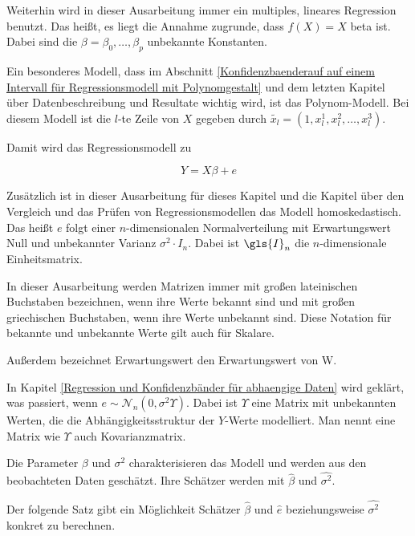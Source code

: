 \documentclass[12pt,a4paper]{article}
\theoremstyle{definition}
\theoremstyle{definition}
\theoremstyle{definition}
\theoremstyle{definition}
\begin{document}
Weiterhin wird in dieser Ausarbeitung immer ein multiples, lineares Regression benutzt. Das heißt, es liegt die Annahme zugrunde, dass $f(X) = X$ \gls{beta} ist. Dabei sind die $\beta = \beta_{0}, \ldots, \beta_{p}$ unbekannte Konstanten. 

Ein besonderes Modell, dass im Abschnitt \ref{Konfidenzbaenderauf auf einem Intervall für Regressionsmodell mit Polynomgestalt} und dem letzten Kapitel über Datenbeschreibung und Resultate wichtig wird, ist das Polynom-Modell. Bei diesem Modell ist die $l$-te Zeile von $X$ gegeben durch $\tilde{x_l} = (1, x_{l}^1, x_{l}^2, \ldots, x_{l}^3)$.

Damit wird das Regressionsmodell zu

\begin{equation}
Y = X \beta + e \label{Grundmodell_Regression}
\end{equation}

Zusätzlich ist in dieser Ausarbeitung für dieses Kapitel und die Kapitel über den Vergleich und das Prüfen von Regressionsmodellen das Modell homoskedastisch. Das heißt $e$ folgt einer $n$-dimensionalen Normalverteilung mit Erwartungswert Null und unbekannter Varianz $\sigma^2 \cdot I_n$. Dabei ist $\gls{I}_n$ die $n$-dimensionale Einheitsmatrix. 

In dieser Ausarbeitung werden \gls{Matrizen} immer mit großen lateinischen Buchstaben bezeichnen, wenn ihre Werte bekannt sind und mit großen griechischen Buchstaben, wenn ihre Werte unbekannt sind. Diese Notation für bekannte und unbekannte Werte gilt auch für Skalare. 

Außerdem bezeichnet \gls{Erwartungswert} den Erwartungswert von W.

In Kapitel \ref{Regression und Konfidenzbänder für abhaengige Daten} wird geklärt, was passiert, wenn $e \sim \mathscr{N}_{n}(0,\sigma^2 \Upsilon)$. Dabei ist $\Upsilon$ eine Matrix mit unbekannten Werten, die die Abhängigkeitsstruktur der $Y$-Werte modelliert. Man nennt eine Matrix wie $\Upsilon$ auch Kovarianzmatrix.

Die Parameter $\beta$ und $\sigma^2$ charakterisieren das Modell und werden aus den beobachteten Daten geschätzt. Ihre Schätzer werden mit $\hat{\beta}$ und $\widehat{\sigma^2}$.

Der folgende Satz gibt ein Möglichkeit Schätzer $\hat{\beta}$ und $\hat{e}$ beziehungsweise $\widehat{\sigma^2}$ konkret zu berechnen.
\end{document}
